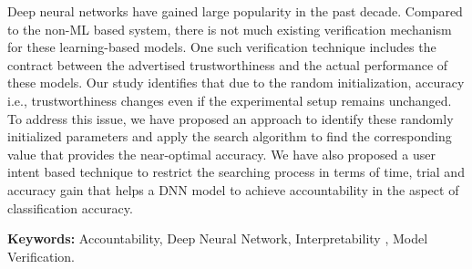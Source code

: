 Deep neural networks have gained large popularity in the past decade. Compared to the non-ML based system, there is not much existing verification mechanism for these learning-based models. One such verification technique includes the contract between the advertised trustworthiness and the actual performance of these models. Our study identifies that due to the random initialization, accuracy i.e., trustworthiness changes even if the experimental setup remains unchanged. To address this issue, we have proposed an approach to identify these randomly initialized parameters and apply the search algorithm to find the corresponding value that provides the near-optimal accuracy.
We have also proposed a user intent based technique to restrict the searching process in terms of time, trial and accuracy gain that helps a DNN model to achieve accountability in the aspect of classification accuracy.
 

\textbf{Keywords:} Accountability, Deep Neural Network, Interpretability , Model Verification.